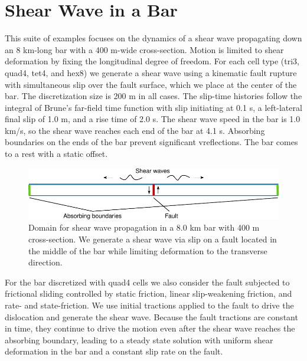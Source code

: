 
\section{Shear Wave in a Bar}

This suite of examples focuses on the dynamics of a shear wave propagating
down an 8 km-long bar with a 400 m-wide cross-section. Motion is limited
to shear deformation by fixing the longitudinal degree of freedom.
For each cell type (tri3, quad4, tet4, and hex8) we generate a shear
wave using a kinematic fault rupture with simultaneous slip over the
fault surface, which we place at the center of the bar. The discretization
size is 200 m in all cases. The slip-time histories follow the integral
of Brune's far-field time function with slip initiating at 0.1 s,
a left-lateral final slip of 1.0 m, and a rise time of 2.0 s. The
shear wave speed in the bar is 1.0 km/s, so the shear wave reaches
each end of the bar at 4.1 s. Absorbing boundaries on the ends of
the bar prevent significant vreflections. The bar comes to a rest with
a static offset.

\begin{figure}
\begin{centering}
\includegraphics{tutorials/shearwave/figs/bar}
\par\end{centering}

\caption{Domain for shear wave propagation in a 8.0 km bar with 400 m cross-section.
We generate a shear wave via slip on a fault located in the middle
of the bar while limiting deformation to the transverse direction.\label{fig:shearwave:domain}}
\end{figure}


For the bar discretized with quad4 cells we also consider the fault
subjected to frictional sliding controlled by static friction, linear
slip-weakening friction, and rate- and state-friction. We use initial
tractions applied to the fault to drive the dislocation and generate
the shear wave. Because the fault tractions are constant in time,
they continue to drive the motion even after the shear wave reaches
the absorbing boundary, leading to a steady state solution with uniform
shear deformation in the bar and a constant slip rate on the fault. 


